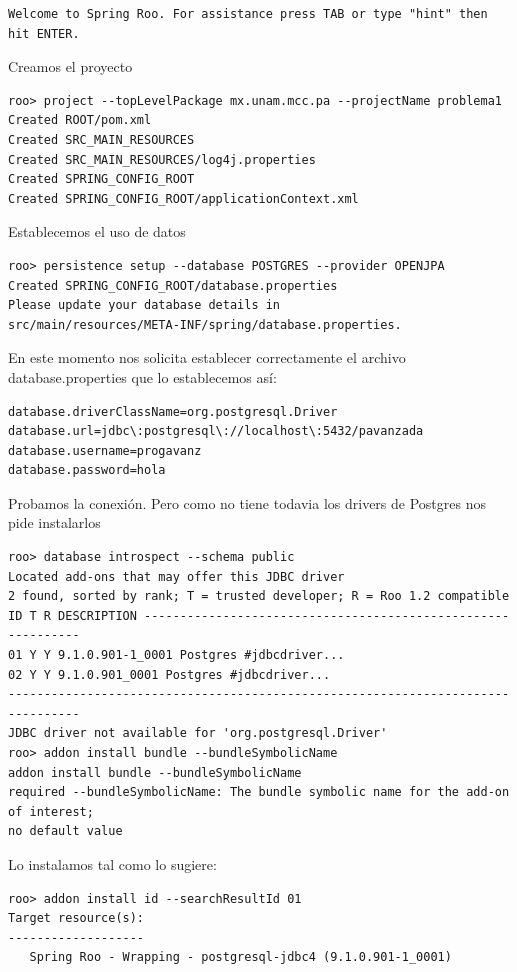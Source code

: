 \documentclass[12pt]{article}
\begin{document}
\begin{enumerate}
\begin{lstlisting}[frame=single]
Welcome to Spring Roo. For assistance press TAB or type "hint" then hit ENTER.
\end{lstlisting}

Creamos el proyecto 
\begin{lstlisting}[frame=single] 
roo> project --topLevelPackage mx.unam.mcc.pa --projectName problema1
Created ROOT/pom.xml
Created SRC_MAIN_RESOURCES
Created SRC_MAIN_RESOURCES/log4j.properties
Created SPRING_CONFIG_ROOT
Created SPRING_CONFIG_ROOT/applicationContext.xml
\end{lstlisting}

Establecemos el uso de datos

\begin{lstlisting}[frame=single] 
roo> persistence setup --database POSTGRES --provider OPENJPA
Created SPRING_CONFIG_ROOT/database.properties
Please update your database details in 
src/main/resources/META-INF/spring/database.properties.
\end{lstlisting}

En este momento nos solicita establecer correctamente el archivo database.properties que lo establecemos así:

\begin{lstlisting}[frame=single] 
database.driverClassName=org.postgresql.Driver
database.url=jdbc\:postgresql\://localhost\:5432/pavanzada
database.username=progavanz
database.password=hola
\end{lstlisting}

Probamos la conexión. Pero como no tiene todavia los drivers de Postgres nos pide instalarlos
\begin{lstlisting}[frame=single] 
roo> database introspect --schema public
Located add-ons that may offer this JDBC driver
2 found, sorted by rank; T = trusted developer; R = Roo 1.2 compatible
ID T R DESCRIPTION -------------------------------------------------------------
01 Y Y 9.1.0.901-1_0001 Postgres #jdbcdriver...
02 Y Y 9.1.0.901_0001 Postgres #jdbcdriver...
--------------------------------------------------------------------------------
JDBC driver not available for 'org.postgresql.Driver'
roo> addon install bundle --bundleSymbolicName 
addon install bundle --bundleSymbolicName 
required --bundleSymbolicName: The bundle symbolic name for the add-on of interest; 
no default value
\end{lstlisting}

Lo instalamos tal como lo sugiere:
\begin{lstlisting}[frame=single] 
roo> addon install id --searchResultId 01
Target resource(s):
-------------------
   Spring Roo - Wrapping - postgresql-jdbc4 (9.1.0.901-1_0001)


\end{lstlisting}
\end{enumerate}
\end{document}
